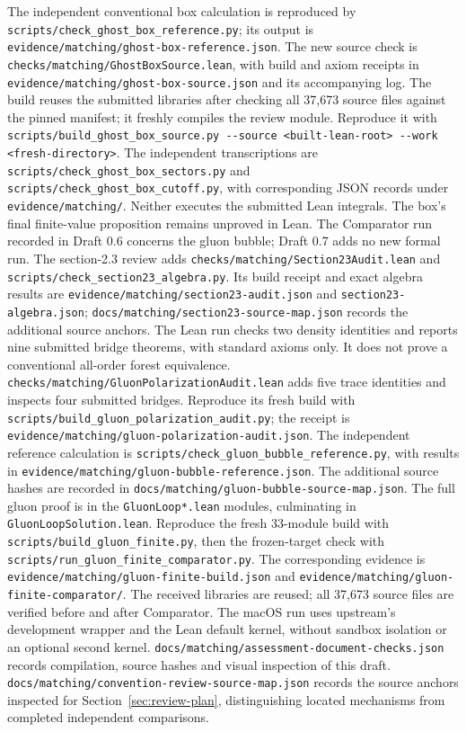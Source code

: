 \documentclass[11pt]{article}
\newcommand{\code}[1]{{\small\nolinkurl{#1}}}
\begin{document}
The independent conventional box calculation is reproduced by
\code{scripts/check_ghost_box_reference.py}; its output is
\code{evidence/matching/ghost-box-reference.json}.
The new source check is \code{checks/matching/GhostBoxSource.lean}, with
build and axiom receipts in \code{evidence/matching/ghost-box-source.json}
and its accompanying log. The build reuses the submitted libraries after
checking all 37,673 source files against the pinned manifest; it freshly
compiles the review module. Reproduce it with
\code{scripts/build_ghost_box_source.py --source <built-lean-root> --work <fresh-directory>}.
The independent transcriptions are
\code{scripts/check_ghost_box_sectors.py} and
\code{scripts/check_ghost_box_cutoff.py}, with corresponding JSON records
under \code{evidence/matching/}. Neither executes the submitted Lean
integrals. The box's final finite-value proposition remains unproved in
Lean. The Comparator run recorded in Draft 0.6 concerns the gluon bubble;
Draft 0.7 adds no new formal run.
The section-2.3 review adds \code{checks/matching/Section23Audit.lean}
and \code{scripts/check_section23_algebra.py}. Its build receipt and exact
algebra results are \code{evidence/matching/section23-audit.json} and
\code{section23-algebra.json}; \code{docs/matching/section23-source-map.json}
records the additional source anchors. The Lean run checks two density
identities and reports nine submitted bridge theorems, with standard axioms
only. It does not prove a conventional all-order forest equivalence.
\code{checks/matching/GluonPolarizationAudit.lean} adds five trace identities and inspects four submitted bridges. Reproduce its fresh build with \code{scripts/build_gluon_polarization_audit.py}; the receipt is \code{evidence/matching/gluon-polarization-audit.json}. The independent reference calculation is \code{scripts/check_gluon_bubble_reference.py}, with results in \code{evidence/matching/gluon-bubble-reference.json}. The additional source hashes are recorded in \code{docs/matching/gluon-bubble-source-map.json}. The full gluon proof is in the \code{GluonLoop*.lean} modules, culminating in
\code{GluonLoopSolution.lean}. Reproduce the fresh 33-module build with
\code{scripts/build_gluon_finite.py}, then the frozen-target check with
\code{scripts/run_gluon_finite_comparator.py}. The corresponding evidence is
\code{evidence/matching/gluon-finite-build.json} and
\code{evidence/matching/gluon-finite-comparator/}. The received libraries are
reused; all 37,673 source files are verified before and after Comparator.
The macOS run uses upstream's development wrapper and the Lean default
kernel, without sandbox isolation or an optional second kernel.
\code{docs/matching/assessment-document-checks.json} records compilation,
source hashes and visual inspection of this draft.
\code{docs/matching/convention-review-source-map.json} records the source
anchors inspected for Section~\ref{sec:review-plan}, distinguishing located
mechanisms from completed independent comparisons.
\end{document}
